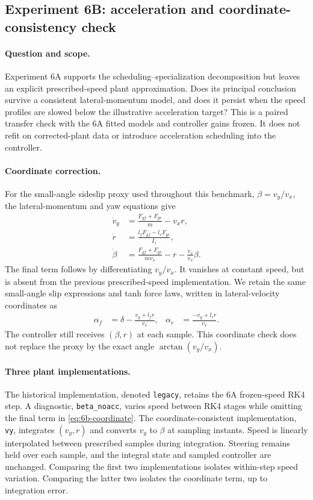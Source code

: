 \subsection{Experiment 6B: acceleration and coordinate-consistency check}
\label{sec:experiment6b}

\paragraph{Question and scope.}
Experiment 6A supports the scheduling--specialization decomposition but leaves
an explicit prescribed-speed plant approximation. Does its principal conclusion
survive a consistent lateral-momentum model, and does it persist when the speed
profiles are slowed below the illustrative acceleration target? This is a
paired transfer check with the 6A fitted models and controller gains frozen.
It does not refit on corrected-plant data or introduce acceleration scheduling
into the controller.

\paragraph{Coordinate correction.}
For the small-angle sideslip proxy used throughout this benchmark,
$\beta=v_y/v_x$, the lateral-momentum and yaw equations give
\begin{align}
 \dot v_y&=\frac{F_{yf}+F_{yr}}{m}-v_xr,\\
 \dot r&=\frac{l_fF_{yf}-l_rF_{yr}}{I_z},\\
 \dot\beta&=\frac{F_{yf}+F_{yr}}{mv_x}-r
             -\frac{\dot v_x}{v_x}\beta.
 \label{eq:6b-coordinate}
\end{align}
The final term follows by differentiating $v_y/v_x$. It vanishes at constant
speed, but is absent from the previous prescribed-speed implementation.
We retain the same small-angle slip expressions and tanh force laws, written
in lateral-velocity coordinates as
\begin{align}
 \alpha_f&=\delta-\frac{v_y+l_fr}{v_x}, &
 \alpha_r&=\frac{-v_y+l_rr}{v_x}.
\end{align}
The controller still receives $(\beta,r)$ at each sample. This coordinate check
does not replace the proxy by the exact angle $\arctan(v_y/v_x)$.

\paragraph{Three plant implementations.}
The historical implementation, denoted \texttt{legacy}, retains the 6A
frozen-speed RK4 step. A diagnostic, \texttt{beta\_noacc}, varies speed between
RK4 stages while omitting the final term in \cref{eq:6b-coordinate}. The
coordinate-consistent implementation, \texttt{vy}, integrates $(v_y,r)$ and
converts $v_y$ to $\beta$ at sampling instants. Speed is linearly interpolated
between prescribed samples during integration. Steering remains held over each
sample, and the integral state and sampled controller are unchanged. Comparing
the first two implementations isolates within-step speed variation. Comparing
the latter two isolates the coordinate term, up to integration error.

